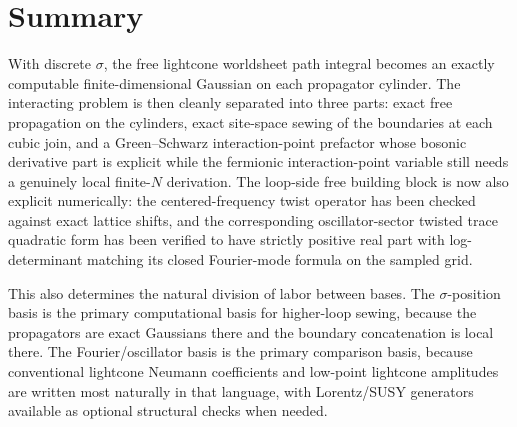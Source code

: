 \documentclass[11pt]{article}
\numberwithin{equation}{section}
\begin{document}
\section{Summary}
With discrete $\sigma$, the free lightcone worldsheet path integral becomes an exactly computable finite-dimensional Gaussian on each propagator cylinder. The interacting problem is then cleanly separated into three parts: exact free propagation on the cylinders, exact site-space sewing of the boundaries at each cubic join, and a Green--Schwarz interaction-point prefactor whose bosonic derivative part is explicit while the fermionic interaction-point variable still needs a genuinely local finite-$N$ derivation. The loop-side free building block is now also explicit numerically: the centered-frequency twist operator has been checked against exact lattice shifts, and the corresponding oscillator-sector twisted trace quadratic form has been verified to have strictly positive real part with log-determinant matching its closed Fourier-mode formula on the sampled grid.

This also determines the natural division of labor between bases. The $\sigma$-position basis is the primary computational basis for higher-loop sewing, because the propagators are exact Gaussians there and the boundary concatenation is local there. The Fourier/oscillator basis is the primary comparison basis, because conventional lightcone Neumann coefficients and low-point lightcone amplitudes are written most naturally in that language, with Lorentz/SUSY generators available as optional structural checks when needed.
\end{document}
